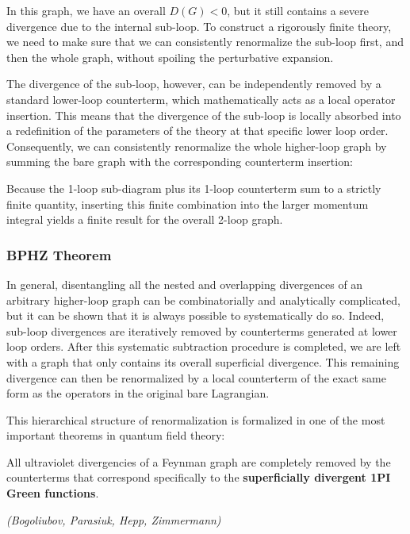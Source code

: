
In this graph, we have an overall $D(G) < 0$, but it still contains a severe divergence due to the internal sub-loop. To construct a rigorously finite theory, we need to make sure that we can consistently renormalize the sub-loop first, and then the whole graph, without spoiling the perturbative expansion.

The divergence of the sub-loop, however, can be independently removed by a standard lower-loop counterterm, which mathematically acts as a local operator insertion. This means that the divergence of the sub-loop is locally absorbed into a redefinition of the parameters of the theory at that specific lower loop order. Consequently, we can consistently renormalize the whole higher-loop graph by summing the bare graph with the corresponding counterterm insertion:


Because the 1-loop sub-diagram plus its 1-loop counterterm sum to a strictly finite quantity, inserting this finite combination into the larger momentum integral yields a finite result for the overall 2-loop graph.

\subsubsection{BPHZ Theorem}

In general, disentangling all the nested and overlapping divergences of an arbitrary higher-loop graph can be combinatorially and analytically complicated, but it can be shown that it is always possible to systematically do so. Indeed, sub-loop divergences are iteratively removed by counterterms generated at lower loop orders. After this systematic subtraction procedure is completed, we are left with a graph that only contains its overall superficial divergence. This remaining divergence can then be renormalized by a local counterterm of the exact same form as the operators in the original bare Lagrangian.

This hierarchical structure of renormalization is formalized in one of the most important theorems in quantum field theory:

\begin{theorem}
    All ultraviolet divergencies of a Feynman graph are completely removed by the counterterms that correspond specifically to the \textbf{superficially divergent 1PI Green functions}.

    \textit{(Bogoliubov, Parasiuk, Hepp, Zimmermann)}
\end{theorem}

